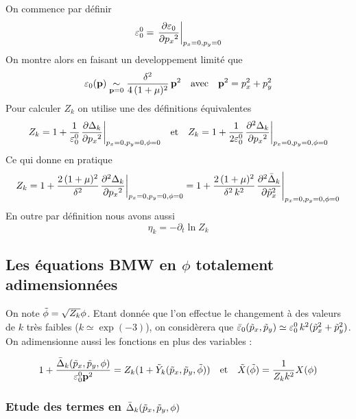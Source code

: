 \documentclass[10pt]{article}
\begin{document}
On commence par définir 
\begin{equation}
\varepsilon_0^0 ={\left. \frac{\partial \varepsilon_0}{ \partial {{p_x}^2}} \right|}_{p_x = 0, p_y = 0}
\end{equation}
On montre alors en faisant un developpement limité que
\begin{equation}
\varepsilon_0({\bf p})  \underset{{\bf p} = 0}{\sim} \frac{\delta^2}{4\,(1+\mu)^2} \, {\bf p}^2 \quad \text{avec} \quad {\bf p}^2 = p_x^2 + p_y^2
\end{equation}
Pour calculer $Z_k$ on utilise une des définitions équivalentes
\begin{equation}
Z_k = 1+\frac{1}{\varepsilon_0^0}{\left. \frac{\partial \Delta_k}{\partial {p_x}^2} \right|}_{p_x = 0, p_y = 0, \phi = 0}  \quad \text{et} \quad 
Z_k = 1+\frac{1}{2\varepsilon_0^0}{\left. \frac{\partial^2 \Delta_k}{\partial {p_x}^2} \right|}_{p_x = 0, p_y = 0, \phi = 0} 
\end{equation}
Ce qui donne en pratique
\begin{equation}
Z_k = 1+\frac{2\,(1+\mu)^2}{\delta^2}{\left. \frac{\partial^2 \Delta_k}{\partial {p_x}^2} \right|}_{p_x = 0, p_y = 0, \phi = 0} = 1+\frac{2\,(1+\mu)^2}{\delta^2\, k^2}{\left. \frac{\partial^2 \bar{\Delta}_k}{\partial {\tilde{p}_x}^2} \right|}_{p_x = 0, p_y = 0, \phi = 0}
\end{equation}
En outre par définition nous avons aussi
\begin{equation}
\eta_k = -\partial_t \ln Z_k 
\end{equation}

\vspace*{11pt}
\subsection{Les équations BMW en $\phi$ totalement adimensionnées}

On note $\tilde{\phi} = \sqrt{Z_k}\phi$. Etant donnée que l'on effectue le changement à des valeurs de $k$ très faibles ($k \simeq \exp(-3)$), on considèrera que $\bar{\varepsilon}_0(\tilde{p}_x,\tilde{p}_y) \simeq \varepsilon_0^0\,k^2(\tilde{p}_x^2+\tilde{p}_y^2)$. On adimensionne aussi les fonctions en plus des variables :

\begin{equation*}
1 + \frac{\bar{\Delta}_k(\tilde{p}_x, \tilde{p}_y,\phi)}{\varepsilon_0^0 {\bf p}^2} = Z_k(1+\tilde{Y}_k(\tilde{p}_x, \tilde{p}_y,\tilde{\phi})) \quad \text{et} \quad \tilde{X}(\tilde{\phi}) = \frac{1}{Z_k k^2} X(\phi)
\end{equation*}


\vspace*{11pt}
\subsubsection{Etude des termes en $\bar{\Delta}_k(\tilde{p}_x, \tilde{p}_y,\phi)$}
\end{document}
